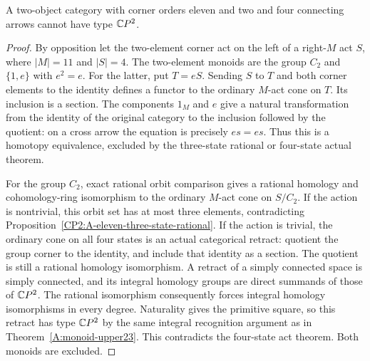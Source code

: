 \begin{proposition}
\label{CP2:A-eleven-two-four}
A two-object category with corner orders eleven and two
and four connecting arrows cannot have type $\mathbb{C}P^2$.
\end{proposition}
\begin{proof}
By opposition let the two-element corner act on the left
of a right-$M$ act $S$, where $|M|=11$ and $|S|=4$.
The two-element monoids are the group $C_2$ and
$\{1,e\}$ with $e^2=e$.
For the latter, put $T=eS$. Sending $S$ to $T$ and
both corner elements to the identity defines a functor
to the ordinary $M$-act cone on $T$. Its inclusion is a
section. The components $1_M$ and $e$ give a natural
transformation from the identity of the original category
to the inclusion followed by the quotient: on a cross
arrow the equation is precisely $es=es$.
Thus this is a homotopy equivalence, excluded by the
three-state rational or four-state actual theorem.

For the group $C_2$, exact rational orbit comparison
gives a rational homology and cohomology-ring isomorphism
to the ordinary $M$-act cone on $S/C_2$. If the action
is nontrivial, this orbit set has at most three elements,
contradicting Proposition~\ref{CP2:A-eleven-three-state-rational}.
If the action is trivial, the ordinary cone on all four
states is an actual categorical retract: quotient the
group corner to the identity, and include that identity
as a section. The quotient is still a rational homology
isomorphism. A retract of a simply connected space is
simply connected, and its integral homology groups are
direct summands of those of $\mathbb{C}P^2$. The rational
isomorphism consequently forces integral homology
isomorphisms in every degree. Naturality gives the
primitive square, so this retract has type $\mathbb{C}P^2$ by the same integral recognition argument as in
Theorem~\ref{A:monoid-upper23}. This contradicts
the four-state act theorem. Both monoids are excluded.
\end{proof}


